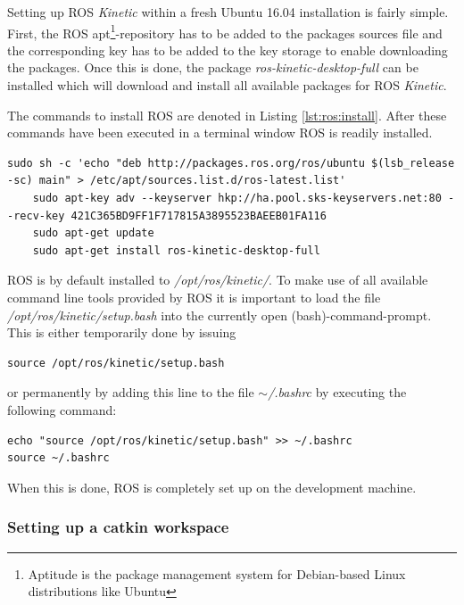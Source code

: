 Setting up ROS \textit{Kinetic} within a fresh Ubuntu 16.04 installation is fairly simple. First, the ROS apt\footnote{Aptitude is the package management system for Debian-based Linux distributions like Ubuntu}-repository has to be added to the packages sources file and the corresponding key has to be added to the key storage to enable downloading the packages. Once this is done, the package \textit{ros-kinetic-desktop-full} can be installed which will download and install all available packages for ROS \textit{Kinetic}.

The commands to install ROS are denoted in Listing \ref{lst:ros:install}. After these commands have been executed in a terminal window ROS is readily installed.

\begin{minipage}{\linewidth}
	\begin{lstlisting}[caption={Commands for installing ROS\cite{ros:install}},label={lst:ros:install}]
	sudo sh -c 'echo "deb http://packages.ros.org/ros/ubuntu $(lsb_release -sc) main" > /etc/apt/sources.list.d/ros-latest.list'
	sudo apt-key adv --keyserver hkp://ha.pool.sks-keyservers.net:80 --recv-key 421C365BD9FF1F717815A3895523BAEEB01FA116
	sudo apt-get update
	sudo apt-get install ros-kinetic-desktop-full
	\end{lstlisting}
\end{minipage}

ROS is by default installed to \textit{/opt/ros/kinetic/}. To make use of all available command line tools provided by ROS it is important to load the file \textit{/opt/ros/kinetic/setup.bash} into the currently open (bash)-command-prompt. This is either temporarily done by issuing

\begin{lstlisting}[caption={Temporarily loading the ROS environment into bash}]
source /opt/ros/kinetic/setup.bash
\end{lstlisting}

or permanently by adding this line to the file \textit{$\sim$/.bashrc} by executing the following command:

\begin{lstlisting}[caption={Permamently installing the ROS environment into bash}]
echo "source /opt/ros/kinetic/setup.bash" >> ~/.bashrc
source ~/.bashrc
\end{lstlisting}

When this is done, ROS is completely set up on the development machine.

\subsubsection[Setting up catkin]{Setting up a catkin workspace\cite{ros:install:catkin}} 

